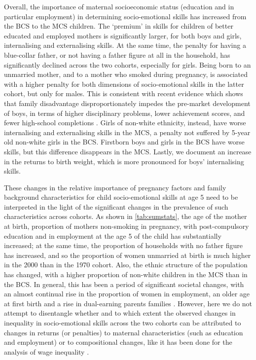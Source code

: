 Overall, the importance of maternal socioeconomic status (education and in particular employment) in determining socio-emotional skills has increased from the BCS to the MCS children. The `premium' in skills for children of better educated and employed mothers is significantly larger, for both boys and girls, internalising and externalising skills. At the same time, the penalty for having a blue-collar father, or not having a father figure at all in the household, has significantly declined across the two cohorts, especially for girls. Being born to an unmarried mother, and to a mother who smoked during pregnancy, is associated with a higher penalty for both dimensions of socio-emotional skills in the latter cohort, but only for males. This is consistent with recent evidence which shows that family disadvantage disproportionately impedes the pre-market development of boys, in terms of higher disciplinary problems, lower achievement scores, and fewer high-school completions \citep{autor2016family}. Girls of non-white ethnicity, instead, have worse internalising and externalising skills in the MCS, a penalty not suffered by 5-year old non-white girls in the BCS. Firstborn boys and girls in the BCS have worse skills, but this difference disappears in the MCS. Lastly, we document an increase in the returns to birth weight, which is more pronounced for boys' internalising skills.

These changes in the relative importance of pregnancy factors and family background characteristics for child socio-emotional skills at age 5 need to be interpreted in the light of the significant changes in the prevalence of such characteristics across cohorts. As shown in \autoref{tab:sumstats}, the age of the mother at birth, proportion of mothers non-smoking in pregnancy, with post-compulsory education and in employment at the age 5 of the child has substantially increased; at the same time, the proportion of households with no father figure has increased, and so the proportion of women unmarried at birth is much higher in the 2000 than in the 1970 cohort. Also, the ethnic structure of the population has changed, with a higher proportion of non-white children in the MCS than in the BCS. In general, this has been a period of significant societal changes, with an almost continual rise in the proportion of women in employment, an older age at first birth and a rise in dual-earning parents families \citep{roantree2018women}. However, here we do not attempt to disentangle whether and to which extent the observed changes in inequality in socio-emotional skills across the two cohorts can be attributed to changes in returns (or penalties) to maternal characteristics (such as education and employment) or to compositional changes, like it has been done for the analysis of wage inequality \citep{blundell2007changes}.

